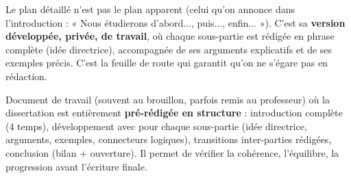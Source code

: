 \documentclass[11pt]{article}
\newcommand{\cle}[1]{{\popxbold\color{popdark}#1}}
\begin{document}
Le \cle{plan détaillé} n'est pas le plan apparent (celui qu'on annonce dans l'introduction : « Nous étudierons d'abord..., puis..., enfin... »). C'est sa \textbf{version développée, privée, de travail}, où chaque sous-partie est rédigée en phrase complète (idée directrice), accompagnée de ses arguments explicatifs et de ses exemples précis. C'est la \cle{feuille de route} qui garantit qu'on ne s'égare pas en rédaction.

\begin{definition}
Document de travail (souvent au brouillon, parfois remis au professeur) où la dissertation est entièrement \textbf{pré-rédigée en structure} : introduction complète (4 temps), développement avec pour chaque sous-partie (idée directrice, arguments, exemples, connecteurs logiques), transitions inter-parties rédigées, conclusion (bilan + ouverture). Il permet de vérifier la cohérence, l'équilibre, la progression avant l'écriture finale.
\end{definition}
\end{document}
